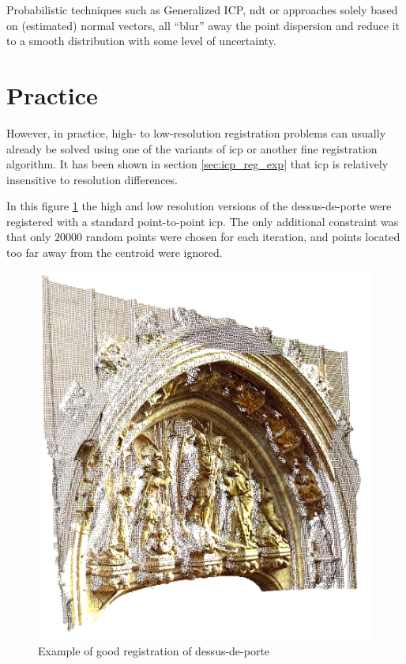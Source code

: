 Probabilistic techniques such as Generalized ICP, \gls{ndt} or approaches solely based on (estimated) normal vectors, all ``blur'' away the point dispersion and reduce it to a smooth distribution with some level of uncertainty.


\section{Practice}
However, in practice, high- to low-resolution registration problems can usually already be solved using one of the variants of \gls{icp} or another fine registration algorithm. It has been shown in section \ref{sec:icp_reg_exp} that \gls{icp} is relatively insensitive to resolution differences.

In this figure \ref{fig:ddp_good} the high and low resolution versions of the dessus-de-porte were registered with a standard point-to-point \gls{icp}. The only additional constraint was that only $20000$ random points were chosen for each iteration, and points located too far away from the centroid were ignored.

\begin{figure}[h]
\centering
\includegraphics[width=.35\textwidth]{fig/ddp_icp_good.png}
\caption{Example of good registration of dessus-de-porte}
\label{fig:ddp_good}
\end{figure}
